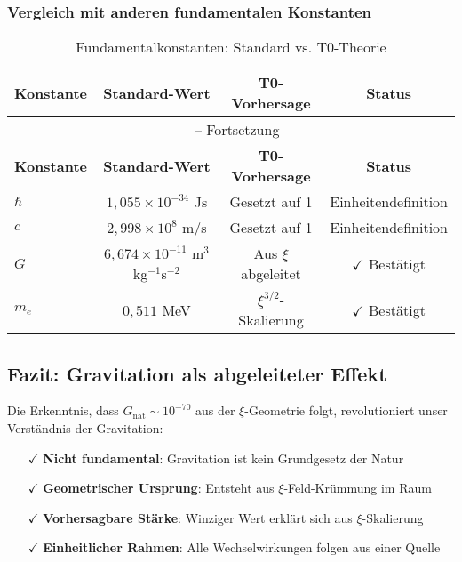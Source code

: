 \documentclass[12pt,a4paper]{article}
\theoremstyle{definition}
\begin{document}
\subsubsection{Vergleich mit anderen fundamentalen Konstanten}

\begin{longtable}{lccc}
	\caption{Fundamentalkonstanten: Standard vs. T0-Theorie} \\
	\toprule
	\textbf{Konstante} & \textbf{Standard-Wert} & \textbf{T0-Vorhersage} & \textbf{Status} \\
	\midrule
	\endfirsthead
	\multicolumn{4}{c}{\tablename\ \thetable{} -- Fortsetzung} \\
	\toprule
	\textbf{Konstante} & \textbf{Standard-Wert} & \textbf{T0-Vorhersage} & \textbf{Status} \\
	\midrule
	\endhead
	$\hbar$ & $1{,}055 \times 10^{-34}$ Js & Gesetzt auf 1 & Einheitendefinition \\
	$c$ & $2{,}998 \times 10^8$ m/s & Gesetzt auf 1 & Einheitendefinition \\
	$G$ & $6{,}674 \times 10^{-11}$ m$^3$kg$^{-1}$s$^{-2}$ & Aus $\xi$ abgeleitet & $\checkmark$ Bestätigt \\
	$m_e$ & $0{,}511$ MeV & $\xi^{3/2}$-Skalierung & $\checkmark$ Bestätigt \\
	\bottomrule
\end{longtable}

\subsection{Fazit: Gravitation als abgeleiteter Effekt}

\begin{revolutionary}
	Die Erkenntnis, dass $G_{\text{nat}} \sim 10^{-70}$ aus der $\xi$-Geometrie folgt, revolutioniert unser Verständnis der Gravitation:
	\begin{itemize}
		\item[$\checkmark$] \textbf{Nicht fundamental}: Gravitation ist kein Grundgesetz der Natur
		\item[$\checkmark$] \textbf{Geometrischer Ursprung}: Entsteht aus $\xi$-Feld-Krümmung im Raum
		\item[$\checkmark$] \textbf{Vorhersagbare Stärke}: Winziger Wert erklärt sich aus $\xi$-Skalierung
		\item[$\checkmark$] \textbf{Einheitlicher Rahmen}: Alle Wechselwirkungen folgen aus einer Quelle
	\end{itemize}
\end{revolutionary}
\end{document}
